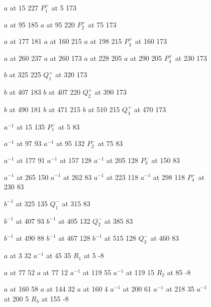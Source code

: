 \documentclass{amsart}
\theoremstyle{definition}
\numberwithin{equation}{section}
\theoremstyle{theorem}
\theoremstyle{remark}
\begin{document}
	\begin{figure}
		\centering
		\small \hair 2pt
		
		\pinlabel $a$ at 15 227
		\pinlabel $P_1^+$ at 5 173
		
		\pinlabel $a$ at 95 185
		\pinlabel $a$ at 95 220
		\pinlabel $P_2^+$ at 75 173
		
		\pinlabel $a$ at 177 181
		\pinlabel $a$ at 160 215
		\pinlabel $a$ at 198 215
		\pinlabel $P_3^+$ at 160 173
		
		\pinlabel $a$ at 260 237
		\pinlabel $a$ at 260 173
		\pinlabel $a$ at 228 205
		\pinlabel $a$ at 290 205
		\pinlabel $P_4^+$ at 230 173
		
		\pinlabel $b$ at 325 225
		\pinlabel $Q_1^+$ at 320 173
		
		\pinlabel $b$ at 407 183
		\pinlabel $b$ at 407 220
		\pinlabel $Q_2^+$ at 390 173
		
		\pinlabel $b$ at 490 181
		\pinlabel $b$ at 471 215
		\pinlabel $b$ at 510 215
		\pinlabel $Q_3^+$ at 470 173
		
		\pinlabel $a^{-1}$ at 15 135
		\pinlabel $P_1^-$ at 5 83
		
		\pinlabel $a^{-1}$ at 97 93
		\pinlabel $a^{-1}$ at 95 132
		\pinlabel $P_2^-$ at 75 83
		
		\pinlabel $a^{-1}$ at 177 91
		\pinlabel $a^{-1}$ at 157 128
		\pinlabel $a^{-1}$ at 205 128
		\pinlabel $P_3^-$ at 150 83
		
		\pinlabel $a^{-1}$ at 265 150
		\pinlabel $a^{-1}$ at 262 83
		\pinlabel $a^{-1}$ at 223 118
		\pinlabel $a^{-1}$ at 298 118
		\pinlabel $P_4^-$ at 230 83
		
		\pinlabel $b^{-1}$ at 325 135
		\pinlabel $Q_1^-$ at 315 83
		
		\pinlabel $b^{-1}$ at 407 93
		\pinlabel $b^{-1}$ at 405 132
		\pinlabel $Q_2^-$ at 385 83
		
		\pinlabel $b^{-1}$ at 490 88
		\pinlabel $b^{-1}$ at 467 128
		\pinlabel $b^{-1}$ at 515 128
		\pinlabel $Q_3^-$ at 460 83
		
		\pinlabel $a$ at 3 32
		\pinlabel $a^{-1}$ at 45 35
		\pinlabel $R_1$ at 5 -8
		
		\pinlabel $a$ at 77 52
		\pinlabel $a$ at 77 12
		\pinlabel $a^{-1}$ at 119 55
		\pinlabel $a^{-1}$ at 119 15
		\pinlabel $R_2$ at 85 -8
		
		\pinlabel $a$ at 160 58
		\pinlabel $a$ at 144 32
		\pinlabel $a$ at 160 4
		\pinlabel $a^{-1}$ at 200 61
		\pinlabel $a^{-1}$ at 218 35
		\pinlabel $a^{-1}$ at 200 5
		\pinlabel $R_3$ at 155 -8
		

\end{figure}
\end{document}

